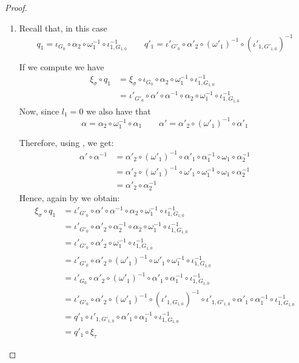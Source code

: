 \begin{proof}\begin{enumerate}
		\item Recall that, in this case \[q_1=\iota_{G_0}\circ \alpha_2\circ \omega^{-1}_1 \circ \iota^{-1}_{1,G_{1,0}} \qquad q'_1=\iota'_{G'_0}\circ \alpha'_2\circ (\omega'_1)^{-1} \circ (\iota'_{1,G'_{1,0}})^{-1}\]
		
		If we compute we have
		\begin{align*}
	\xi_\sigma \circ q_1 &=\xi_\sigma \circ \iota_{G_0}\circ \alpha_2\circ \omega^{-1}_1 \circ \iota^{-1}_{1,G_{1,0}} \\&=\iota'_{G'_0}\circ \alpha'\circ \alpha^{-1}\circ \alpha_2\circ \omega^{-1}_1\circ \iota^{-1}_{1,G_{1,0}}
		\end{align*}
		Now, since $l_1=0$ we also have that 
		\[\alpha=\alpha_2\circ \omega_1^{-1}\circ \alpha_1 \qquad \alpha'=\alpha'_2\circ (\omega'_1)^{-1}\circ \alpha'_1\]
		
		Therefore, using , we get:
		\begin{align*}
	\alpha'\circ \alpha^{-1}&=\alpha'_2\circ (\omega'_1)^{-1}\circ \alpha'_1\circ \alpha^{-1}_1\circ \omega_1\circ \alpha^{-1}_2\\&=\alpha'_2\circ (\omega'_1)^{-1}\circ \omega'_1\circ \omega^{-1}_1\circ \omega_1\circ \alpha^{-1}_2\\&=\alpha'_2\circ \alpha^{-1}_2
		\end{align*}
	Hence, again by  we obtain:
				\begin{align*}
			\xi_\sigma \circ q_1 &=\iota'_{G'_0}\circ \alpha'\circ \alpha^{-1}\circ \alpha_2\circ \omega^{-1}_1\circ \iota^{-1}_{1,G_{1,0}}\\&=\iota'_{G'_0}\circ \alpha'_2\circ \alpha^{-1}_2\circ \alpha_2\circ \omega^{-1}_1\circ \iota^{-1}_{1,G_{1,0}}\\&=\iota'_{G'_0}\circ \alpha'_2\circ \omega^{-1}_1\circ \iota^{-1}_{1,G_{1,0}}\\&=\iota'_{G'_0}\circ \alpha'_2\circ (\omega'_1)^{-1} \circ  \omega'_1\circ \omega^{-1}_1\circ \iota^{-1}_{1,G_{1,0}}\\&=\iota'_{G_0}\circ \alpha'_2\circ (\omega'_1)^{-1} \circ \alpha'_1\circ \alpha^{-1}_1\circ \iota^{-1}_{1,G_{1,0}}\\&=\iota'_{G'_0}\circ \alpha'_2\circ (\omega'_1)^{-1} \circ (\iota'_{1,G_{1,0}})^{-1}\circ \iota'_{1,G'_{1,0}}\circ \alpha'_1\circ \alpha^{-1}_1\circ \iota^{-1}_{1,G_{1,0}}\\&=q'_1\circ \iota'_{1,G'_{1,0}}\circ \alpha'_1\circ \alpha^{-1}_1\circ \iota^{-1}_{1,G_{1,0}}\\&=q'_1\circ \xi_{\tau}
		\end{align*}



\end{enumerate}
\end{proof}
